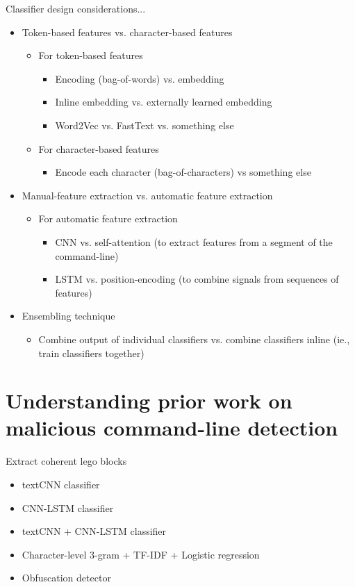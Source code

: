 \documentclass[10pt]{beamer}
\begin{document}
\begin{frame}{Classifier design considerations...}
	\begin{itemize}
		\item Token-based features vs. character-based features
		\begin{itemize}
			\item For token-based features
			\begin{itemize}
				\item Encoding (bag-of-words) vs. embedding
				\item Inline embedding vs. externally learned embedding
				\item Word2Vec vs. FastText vs. something else
			\end{itemize}
			\item For character-based features
			\begin{itemize}
				\item Encode each character (bag-of-characters) vs something else
			\end{itemize}
		\end{itemize}
		\item Manual-feature extraction vs. automatic feature extraction
		\begin{itemize}
			\item For automatic feature extraction
			\begin{itemize}
				\item CNN vs. self-attention (to extract features from a segment of the command-line)
				\item LSTM vs. position-encoding (to combine signals from sequences of features)
			\end{itemize}
		\end{itemize}
		\item Ensembling technique
		\begin{itemize}
			\item Combine output of individual classifiers vs. combine classifiers inline (ie., train classifiers together)
		\end{itemize}
	\end{itemize}
\end{frame}

\section{Understanding prior work on malicious command-line detection}

\begin{frame}[fragile]{Extract coherent lego blocks}
	\begin{itemize}
		\item textCNN classifier \cite{textcnn2016,textcnn2019,powershell2018}
		\item CNN-LSTM classifier \cite{amsi2019}
		\item textCNN + CNN-LSTM classifier \cite{amsi2019}
		\item Character-level 3-gram + TF-IDF + Logistic regression \cite{amsi2019}
		\item Obfuscation detector \cite{feye2018}
	\end{itemize}
\end{frame}
\end{document}
